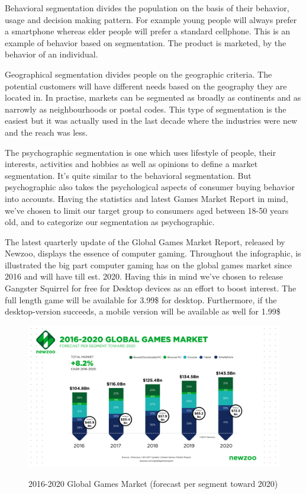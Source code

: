 \documentclass[12p]{article}
\begin{document}
Behavioral segmentation divides the population on the basis of their behavior, usage and decision making pattern. For example young people will always prefer a smartphone whereas elder people will prefer a standard cellphone. This is an example of behavior based on segmentation. The product is marketed, by the behavior of an individual. 

Geographical segmentation divides people on the geographic criteria. The potential customers will have different needs based on the geography they are located in. In practise, markets can be segmented as broadly as continents and as narrowly as neighbourhoods or postal codes. This type of segmentation is the easiest but it was actually used in the last decade where the industries were new and the reach was less.

The psychographic segmentation is one which uses lifestyle of people, their interests, activities and hobbies as well as opinions to define a market segmentation. It’s quite similar to the behavioral segmentation. But psychographic also takes the psychological aspects of consumer buying behavior into accounts. Having the statistics and latest Games Market Report in mind, we’ve chosen to limit our target group to consumers aged between 18-50 years old, and to categorize our segmentation as psychographic.\cite{MarketSegmentation}  

The latest quarterly update of the Global Games Market Report, released by Newzoo, displays the essence of computer gaming. Throughout the infographic, is illustrated the big part computer gaming has on the global games market since 2016 and will have till est. 2020. Having this in mind we’ve chosen to release Gangster Squirrel for free for Desktop devices as an effort to boost interest. The full length game will be available for 3.99\$ for desktop. Furthermore, if the desktop-version succeeds, a mobile version will be available as well for 1.99\$

\begin{figure}[ht]
  \center
  \includegraphics[width=1\textwidth]{BusinessStrategy/GlobalGamesMarket2016-2020.png}
  \label{GlobalGamesMarket2016-2020}
  \caption{2016-2020 Global Games Market (forecast per segment toward 2020) \cite{GlobalGamesMarket}}
\end{figure}
\end{document}
